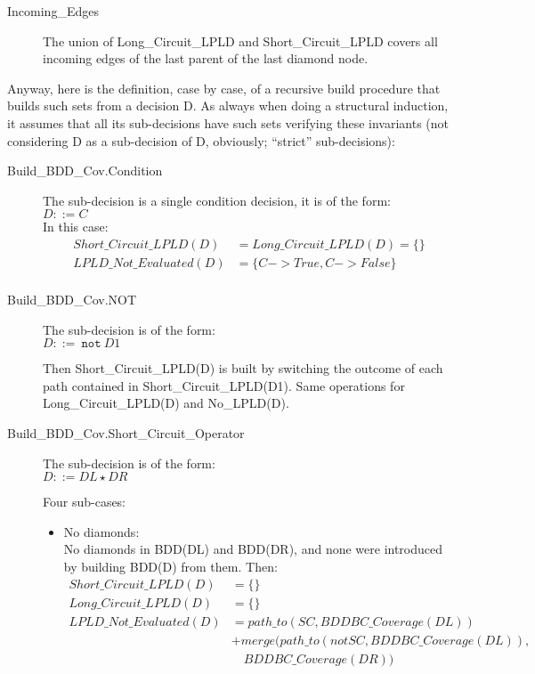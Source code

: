 \documentclass[a4paper,12pt,twoside]{article}
\newcommand{\anysc}{\star}
\newcommand{\adanot}{\texttt{not}}
\begin{document}
\begin{description}
\item[Incoming\_Edges]
  The union of Long\_Circuit\_LPLD and Short\_Circuit\_LPLD covers all incoming
  edges of the last parent of the last diamond node.
\end{description}

Anyway, here is the definition, case by case, of a recursive build
procedure that builds such sets from a decision D. As always when
doing a structural induction, it assumes that all its sub-decisions
have such sets verifying these invariants (not considering D as a
sub-decision of D, obviously; ``strict'' sub-decisions):

\begin{description}
\item[Build\_BDD\_Cov.Condition]
  The sub-decision is a single condition decision, it is of the form:\\
  $D ::= C$\\
  In this case:
  \begin{align*}
    Short\_Circuit\_LPLD(D) & = Long\_Circuit\_LPLD(D) = \{\}\\
    LPLD\_Not\_Evaluated(D) & = \{C -> True, C -> False\}\\
  \end{align*}


\item[Build\_BDD\_Cov.NOT]
  The sub-decision is of the form:\\
  $D ::=\ \adanot{} \ D1$

  Then Short\_Circuit\_LPLD(D) is built by switching the outcome of each
  path contained in Short\_Circuit\_LPLD(D1). Same operations for
  Long\_Circuit\_LPLD(D) and No\_LPLD(D).


\item[Build\_BDD\_Cov.Short\_Circuit\_Operator]
  The sub-decision is of the form:\\
  $D ::= DL \anysc{} DR$

  Four sub-cases:

  \begin{itemize}
  \item No diamonds:\\
    No diamonds in BDD(DL) and BDD(DR), and none were introduced
    by building BDD(D) from them. Then:\\
    \begin{align*}
      Short\_Circuit\_LPLD(D) & = \{\}\\
      Long\_Circuit\_LPLD (D) & = \{\}\\
      LPLD\_Not\_Evaluated(D) & = path\_to(SC, BDDBC\_Coverage(DL))\\
                            & + merge(path\_to(not SC, BDDBC\_Coverage (DL)),\\
                            & \quad BDDBC\_Coverage(DR))
    \end{align*}


\end{itemize}
\end{description}
\end{document}
